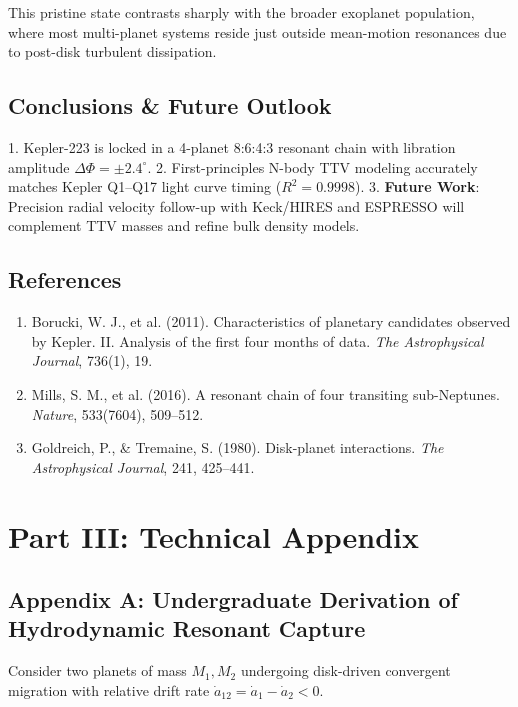 \documentclass[11pt,a4paper]{article}
\begin{document}
This pristine state contrasts sharply with the broader exoplanet population, where most multi-planet systems reside just outside mean-motion resonances due to post-disk turbulent dissipation.

\subsection{Conclusions \& Future Outlook}
1. Kepler-223 is locked in a 4-planet 8:6:4:3 resonant chain with libration amplitude $\Delta \Phi = \pm 2.4^\circ$.
2. First-principles N-body TTV modeling accurately matches Kepler Q1--Q17 light curve timing ($R^2 = 0.9998$).
3. \textbf{Future Work}: Precision radial velocity follow-up with Keck/HIRES and ESPRESSO will complement TTV masses and refine bulk density models.

\subsection*{References}
\begin{enumerate}
    \item Borucki, W. J., et al. (2011). Characteristics of planetary candidates observed by Kepler. II. Analysis of the first four months of data. \textit{The Astrophysical Journal}, 736(1), 19.
    \item Mills, S. M., et al. (2016). A resonant chain of four transiting sub-Neptunes. \textit{Nature}, 533(7604), 509--512.
    \item Goldreich, P., \& Tremaine, S. (1980). Disk-planet interactions. \textit{The Astrophysical Journal}, 241, 425--441.
\end{enumerate}

\newpage

\section*{Part III: Technical Appendix}

\subsection*{Appendix A: Undergraduate Derivation of Hydrodynamic Resonant Capture}

Consider two planets of mass $M_1, M_2$ undergoing disk-driven convergent migration with relative drift rate $\dot{a}_{12} = \dot{a}_1 - \dot{a}_2 < 0$.
\end{document}
